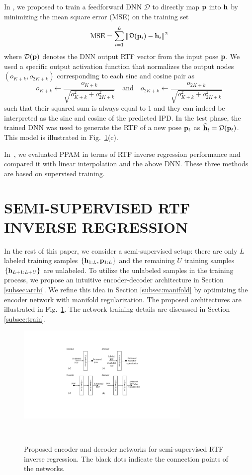 \documentclass{article}
\begin{document}
In \cite{rtfinv2017}, we proposed to train a feedforward DNN $\mathcal{D}$ to directly map ${\bf p}$ into ${\bf h}$ by minimizing the mean square error (MSE) on the training set
\begin{equation}\label{eq:Dmmse}
  \text{MSE} = \sum_{i=1}^L\|\mathcal{D}({\bf p}_i) - {\bf h}_i\|^2
\end{equation}
where $\mathcal{D}({\bf p})$ denotes the DNN output RTF vector from the input pose ${\bf p}$. We used a specific output activation function that normalizes the output nodes $(o_{K+k},o_{2K+k})$ corresponding to each sine and cosine pair as
\begin{equation}\label{eq:ln}
  o_{K+k}\leftarrow \frac{o_{K+k}}{\sqrt{o_{K+k}^2+o_{2K+k}^2}}\quad\text{and}\quad o_{2K+k}\leftarrow \frac{o_{2K+k}}{\sqrt{o_{K+k}^2+o_{2K+k}^2}}
\end{equation}
such that their squared sum is always equal to 1 and they can indeed be interpreted as the sine and cosine of the predicted IPD. In the test phase, the trained DNN was used to generate the RTF of a new pose ${\bf p}_t$ as $\widehat{{\bf h}}_t=\mathcal{D}({\bf p}_t)$. This model is illustrated in Fig.~\ref{fig:dnn}(c).

In~\cite{rtfinv2017}, we evaluated PPAM in terms of RTF inverse regression performance and compared it with linear interpolation and the above DNN. These three methods are based on supervised training.


\section{SEMI-SUPERVISED RTF INVERSE REGRESSION}
\label{sec:inverse}
In the rest of this paper, we consider a semi-supervised setup: there are only $L$ labeled training samples $\{{\bf h}_{1:L}, {\bf p}_{1:L}\}$ and the remaining $U$ training samples $\{{\bf h}_{L+1:L+U}\}$ are unlabeled. To utilize the unlabeled samples in the training process, we propose an intuitive encoder-decoder architecture in Section \ref{subsec:archi}. We refine this idea in Section \ref{subsec:manifold} by optimizing the encoder network with manifold regularization. The proposed architectures are illustrated in Fig.~\ref{fig:dnn}. The network training details are discussed in Section \ref{subsec:train}.

\begin{figure}[tb]
    \centering
    \centerline{\includegraphics[width=8.3cm]{fig1_nn.pdf}}
    \caption{Proposed encoder and decoder networks for semi-supervised RTF inverse regression. The black dots indicate the connection points of the networks.}
    \label{fig:dnn}
\end{figure}
\end{document}
